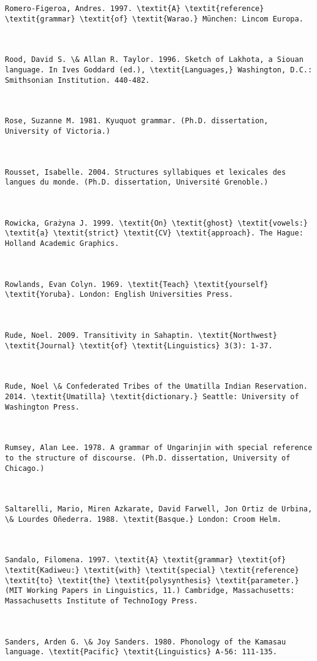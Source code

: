\begin{verbatim}
Romero-Figeroa, Andres. 1997. \textit{A} \textit{reference} \textit{grammar} \textit{of} \textit{Warao.} München: Lincom Europa.



Rood, David S. \& Allan R. Taylor. 1996. Sketch of Lakhota, a Siouan language. In Ives Goddard (ed.), \textit{Languages,} Washington, D.C.: Smithsonian Institution. 440-482.



Rose, Suzanne M. 1981. Kyuquot grammar. (Ph.D. dissertation, University of Victoria.)



Rousset, Isabelle. 2004. Structures syllabiques et lexicales des langues du monde. (Ph.D. dissertation, Université Grenoble.)



Rowicka, Grażyna J. 1999. \textit{On} \textit{ghost} \textit{vowels:} \textit{a} \textit{strict} \textit{CV} \textit{approach}. The Hague: Holland Academic Graphics.



Rowlands, Evan Colyn. 1969. \textit{Teach} \textit{yourself} \textit{Yoruba}. London: English Universities Press.



Rude, Noel. 2009. Transitivity in Sahaptin. \textit{Northwest} \textit{Journal} \textit{of} \textit{Linguistics} 3(3): 1-37.



Rude, Noel \& Confederated Tribes of the Umatilla Indian Reservation. 2014. \textit{Umatilla} \textit{dictionary.} Seattle: University of Washington Press.



Rumsey, Alan Lee. 1978. A grammar of Ungarinjin with special reference to the structure of discourse. (Ph.D. dissertation, University of Chicago.)



Saltarelli, Mario, Miren Azkarate, David Farwell, Jon Ortiz de Urbina, \& Lourdes Oñederra. 1988. \textit{Basque.} London: Croom Helm.



Sandalo, Filomena. 1997. \textit{A} \textit{grammar} \textit{of} \textit{Kadiweu:} \textit{with} \textit{special} \textit{reference} \textit{to} \textit{the} \textit{polysynthesis} \textit{parameter.} (MIT Working Papers in Linguistics, 11.) Cambridge, Massachusetts: Massachusetts Institute of TechnoIogy Press.



Sanders, Arden G. \& Joy Sanders. 1980. Phonology of the Kamasau language. \textit{Pacific} \textit{Linguistics} A-56: 111-135.




\end{verbatim}
